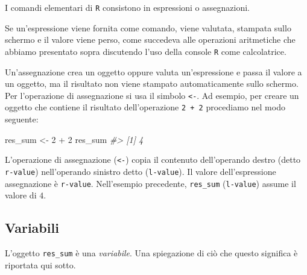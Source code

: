 \documentclass[
]{memoir}
\newenvironment{Shaded}{\begin{snugshade}}{\end{snugshade}}
\newcommand{\CommentTok}[1]{\textcolor[rgb]{0.56,0.35,0.01}{\textit{#1}}}
\newcommand{\DecValTok}[1]{\textcolor[rgb]{0.00,0.00,0.81}{#1}}
\newcommand{\NormalTok}[1]{#1}
\newcommand{\OtherTok}[1]{\textcolor[rgb]{0.56,0.35,0.01}{#1}}
\newcommand{\SpecialCharTok}[1]{\textcolor[rgb]{0.00,0.00,0.00}{#1}}
\theoremstyle{definition}
\theoremstyle{definition}
\theoremstyle{definition}
\theoremstyle{definition}
\theoremstyle{remark}
\begin{document}
I comandi elementari di \texttt{R} consistono in espressioni o assegnazioni.

Se un'espressione viene fornita come comando, viene valutata, stampata sullo schermo e il valore viene perso, come succedeva alle operazioni aritmetiche che abbiamo presentato sopra discutendo l'uso della console \texttt{R} come calcolatrice.

Un'assegnazione crea un oggetto oppure valuta un'espressione e passa il valore a un oggetto, ma il risultato non viene stampato automaticamente sullo schermo. Per l'operazione di assegnazione si usa il simbolo \texttt{\textless{}-}. Ad esempio, per creare un oggetto che contiene il risultato dell'operazione \texttt{2\ +\ 2} procediamo nel modo seguente:

\begin{Shaded}
\begin{Highlighting}[]
\NormalTok{res\_sum }\OtherTok{\textless{}{-}} \DecValTok{2} \SpecialCharTok{+} \DecValTok{2}
\NormalTok{res\_sum}
\CommentTok{\#\textgreater{} [1] 4}
\end{Highlighting}
\end{Shaded}

L'operazione di assegnazione (\texttt{\textless{}-}) copia il contenuto dell'operando destro (detto \texttt{r-value}) nell'operando sinistro detto (\texttt{l-value}). Il valore dell'espressione assegnazione è \texttt{r-value}. Nell'esempio precedente, \texttt{res\_sum} (\texttt{l-value}) assume il valore di \(4\).

\hypertarget{variabili}{%
\subsection{Variabili}\label{variabili}}

L'oggetto \texttt{res\_sum} è una \emph{variabile}. Una spiegazione di ciò che questo significa è riportata qui sotto.
\end{document}
